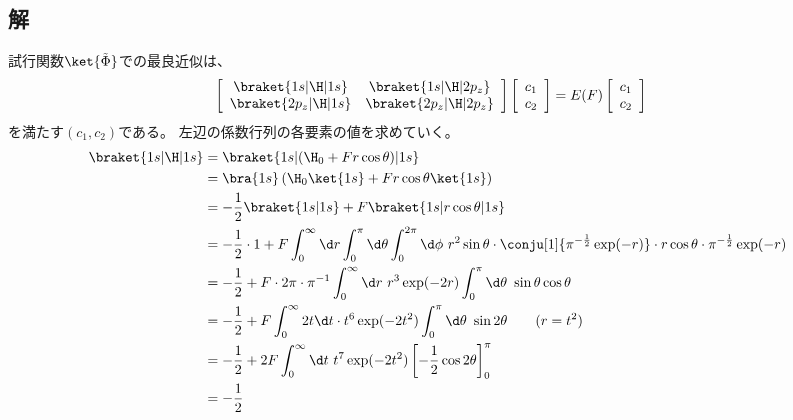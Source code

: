 \subsection{解}
試行関数$\ket{\tilde{\Phi}}$での最良近似は、
\begin{align}
	\left[
	\begin{array}{cc}
		\braket{1s|\H|1s} &
		\braket{1s|\H|2p_z} \\
		\braket{2p_z|\H|1s} &
		\braket{2p_z|\H|2p_z}
	\end{array}
	\right]
		\left[
		\begin{array}{c}
			c_1 \\ c_2
		\end{array}
		\right]
&=
	E(F)
		\left[
		\begin{array}{c}
			c_1 \\ c_2
		\end{array}
		\right]
\end{align}
を満たす$(c_1,c_2)$である。
左辺の係数行列の各要素の値を求めていく。
\begin{align}
	\braket{1s|\H|1s}
&=
	\braket{1s|(\H_0+Fr\cos\theta)|1s} \\
%
%
&=
	\bra{1s}\left(
		\H_0\ket{1s}
		+
		Fr\cos\theta\ket{1s}
	\right) \\
%
%
&=
	-
	\frac{1}{2}
		\braket{1s|1s}
	+
	F \braket{1s|r\cos\theta|1s} \\
%
%
&=
	-
	\frac{1}{2} \cdot 1
	+
	F
		\int_0^{\infty} \d r \int_0^\pi \d\theta \int_0^{2\pi} \d\phi\
			r^2\sin\theta \cdot
				\conju[1]{\pi^{-\frac{1}{2}}\exp(-r)} \cdot
				r \cos\theta \cdot
				\pi^{-\frac{1}{2}}\exp(-r) \\
%
%
&=
	-
	\frac{1}{2}
	+
	F \cdot 2\pi \cdot \pi^{-1}
		\int_0^\infty \d r\
			r^3 \exp(-2r)
		\int_0^\pi \d\theta\
			\sin\theta\cos\theta \\
%
%
&=
	-
	\frac{1}{2}
	+
	F
		\int_0^\infty 2t\d t\cdot %
			t^6 \exp(-2t^2)
		\int_0^\pi \d\theta\
			\sin 2\theta
	\qquad (r=t^2) \\
%
%
&=
	-
	\frac{1}{2}
	+
	2F
		\int_0^\infty \d t\
			t^7 \exp(-2t^2)
		\left[
			-\frac{1}{2}\cos 2\theta
		\right]_0^\pi \\
%
%
&=
	-
	\frac{1}{2}
\end{align}
